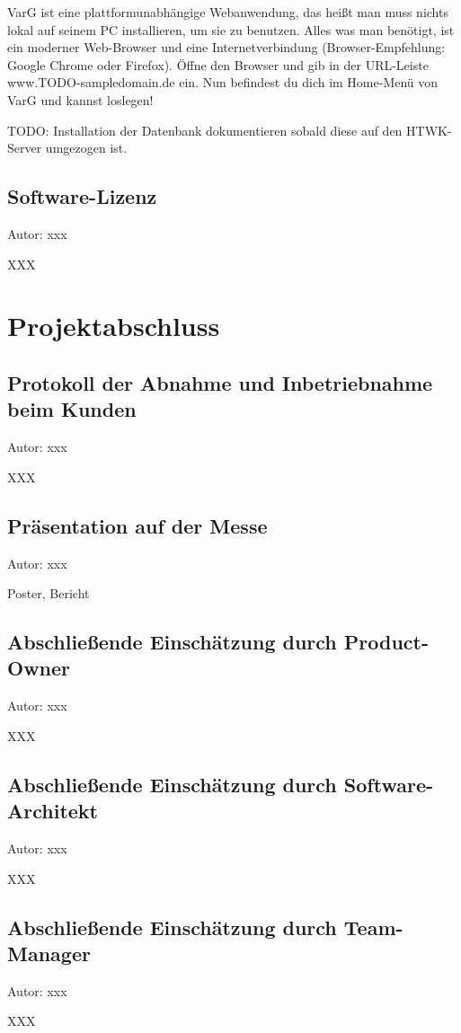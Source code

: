 \documentclass[twoside]{report}
\begin{document}
VarG ist eine plattformunabhängige Webanwendung, das heißt man muss nichts lokal auf seinem PC installieren, um sie zu benutzen. Alles was man benötigt, ist ein moderner Web-Browser und eine Internetverbindung (Browser-Empfehlung: Google Chrome oder Firefox). Öffne den Browser und gib in der URL-Leiste www.TODO-sampledomain.de ein. Nun befindest du dich im Home-Menü von VarG und kannst loslegen!

TODO: Installation der Datenbank dokumentieren sobald diese auf den HTWK-Server umgezogen ist.

\subsection{Software-Lizenz}
{\small Autor: xxx}

XXX


\section{Projektabschluss}

\subsection{Protokoll der Abnahme und Inbetriebnahme beim Kunden}
{\small Autor: xxx}

XXX

\subsection{Präsentation auf der Messe}
{\small Autor: xxx}

Poster, Bericht

\subsection{Abschließende Einschätzung durch Product-Owner}
{\small Autor: xxx}

XXX

\subsection{Abschließende Einschätzung durch Software-Architekt}
{\small Autor: xxx}

XXX

\subsection{Abschließende Einschätzung durch Team-Manager}
{\small Autor: xxx}

XXX
\end{document}
